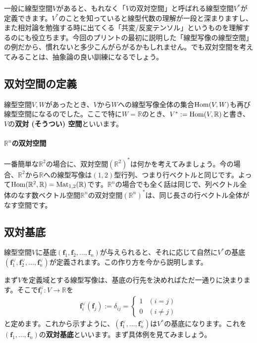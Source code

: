 一般に線型空間$V$があると、もれなく「$V$の双対空間」と呼ばれる線型空間$V^*$が定義できます。$V^*$のことを知っていると線型代数の理解が一段と深まりますし、また相対論を勉強する時に出てくる「共変/反変テンソル」というものを理解するのにも役立ちます。今回のプリントの最初に説明した「線型写像の線型空間」の例だから、慣れないと多少こんがらがるかもしれません。でも双対空間を考えてみることは、抽象論の良い訓練になるでしょう。

\subsection{双対空間の定義}

線型空間$V, W$があったとき、$V$から$W$への線型写像全体の集合$\operatorname{Hom}(V, W)$も再び線型空間になるのでした。ここで特に$W = \mathbb{R}$のとき、$V^* := \operatorname{Hom}(V, \mathbb{R})$と書き、$V$の\textbf{双対 (そうつい) 空間}といいます。

\paragraph{$\mathbb{R}^n$の双対空間} 一番簡単な$\mathbb{R}^2$の場合に、双対空間$(\mathbb{R}^2)^*$は何かを考えてみましょう。今の場合、$\mathbb{R}^2$から$\mathbb{R}$への線型写像は$(1, 2)$型行列、つまり行ベクトルと同じです。よって$\operatorname{Hom}(\mathbb{R}^2, \mathbb{R}) = \operatorname{Mat}_{1, 2}(\mathbb{R})$です。$\mathbb{R}^n$の場合でも全く話は同じで、列ベクトル全体のなす数ベクトル空間$\mathbb{R}^n$の双対空間$(\mathbb{R}^n)^*$は、同じ長さの行ベクトル全体がなす空間です。

\subsection{双対基底}

線型空間$V$に基底$(\bm{f}_1, \bm{f}_2, \ldots, \bm{f}_n)$が与えられると、それに応じて自然に$V^*$の基底$(\bm{f}^{\vee}_1, \bm{f}^{\vee}_2, \ldots, \bm{f}^{\vee}_n)$が定義されます。この作り方を今から説明します。

まず$V$を定義域とする線型写像は、基底の行先を決めればただ一通りに決まります。そこで$\bm{f}^{\vee}_i\colon V \rightarrow\mathbb{R}$を
\begin{align*}
\bm{f}^{\vee}_i(\bm{f}_j) := \delta_{ij} =
\begin{cases}
1 & (i = j) \\
0 & (i \neq j)
\end{cases}
\end{align*}
と定めます。これから示すように、$(\bm{f}^{\vee}_1, \ldots, \bm{f}^{\vee}_n)$は$V^*$の基底になります。これを$(\bm{f}_1, \ldots, \bm{f}_n)$の\textbf{双対基底}といいます。まず具体例を見てみましょう。

